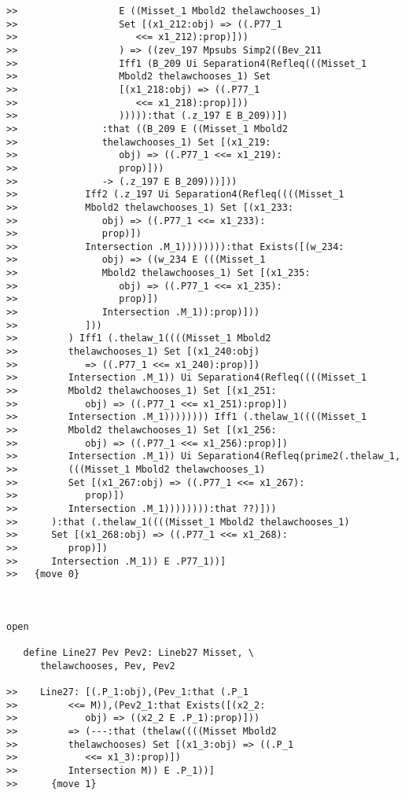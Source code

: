 \documentclass[12pt]{article}
\begin{document}
\begin{verbatim}
>>                  E ((Misset_1 Mbold2 thelawchooses_1)
>>                  Set [(x1_212:obj) => ((.P77_1
>>                     <<= x1_212):prop)]))
>>                  ) => ((zev_197 Mpsubs Simp2((Bev_211
>>                  Iff1 (B_209 Ui Separation4(Refleq(((Misset_1
>>                  Mbold2 thelawchooses_1) Set
>>                  [(x1_218:obj) => ((.P77_1
>>                     <<= x1_218):prop)]))
>>                  ))))):that (.z_197 E B_209))])
>>               :that ((B_209 E ((Misset_1 Mbold2
>>               thelawchooses_1) Set [(x1_219:
>>                  obj) => ((.P77_1 <<= x1_219):
>>                  prop)]))
>>               -> (.z_197 E B_209)))]))
>>            Iff2 (.z_197 Ui Separation4(Refleq((((Misset_1
>>            Mbold2 thelawchooses_1) Set [(x1_233:
>>               obj) => ((.P77_1 <<= x1_233):
>>               prop)])
>>            Intersection .M_1)))))))):that Exists([(w_234:
>>               obj) => ((w_234 E (((Misset_1
>>               Mbold2 thelawchooses_1) Set [(x1_235:
>>                  obj) => ((.P77_1 <<= x1_235):
>>                  prop)])
>>               Intersection .M_1)):prop)]))
>>            ]))
>>         ) Iff1 (.thelaw_1((((Misset_1 Mbold2
>>         thelawchooses_1) Set [(x1_240:obj)
>>            => ((.P77_1 <<= x1_240):prop)])
>>         Intersection .M_1)) Ui Separation4(Refleq((((Misset_1
>>         Mbold2 thelawchooses_1) Set [(x1_251:
>>            obj) => ((.P77_1 <<= x1_251):prop)])
>>         Intersection .M_1)))))))) Iff1 (.thelaw_1((((Misset_1
>>         Mbold2 thelawchooses_1) Set [(x1_256:
>>            obj) => ((.P77_1 <<= x1_256):prop)])
>>         Intersection .M_1)) Ui Separation4(Refleq(prime2(.thelaw_1,
>>         (((Misset_1 Mbold2 thelawchooses_1)
>>         Set [(x1_267:obj) => ((.P77_1 <<= x1_267):
>>            prop)])
>>         Intersection .M_1)))))))):that ??)]))
>>      ):that (.thelaw_1((((Misset_1 Mbold2 thelawchooses_1)
>>      Set [(x1_268:obj) => ((.P77_1 <<= x1_268):
>>         prop)])
>>      Intersection .M_1)) E .P77_1))]
>>   {move 0}



open

   define Line27 Pev Pev2: Lineb27 Misset, \
      thelawchooses, Pev, Pev2

>>    Line27: [(.P_1:obj),(Pev_1:that (.P_1
>>         <<= M)),(Pev2_1:that Exists([(x2_2:
>>            obj) => ((x2_2 E .P_1):prop)]))
>>         => (---:that (thelaw((((Misset Mbold2
>>         thelawchooses) Set [(x1_3:obj) => ((.P_1
>>            <<= x1_3):prop)])
>>         Intersection M)) E .P_1))]
>>      {move 1}




\end{verbatim}
\end{document}
